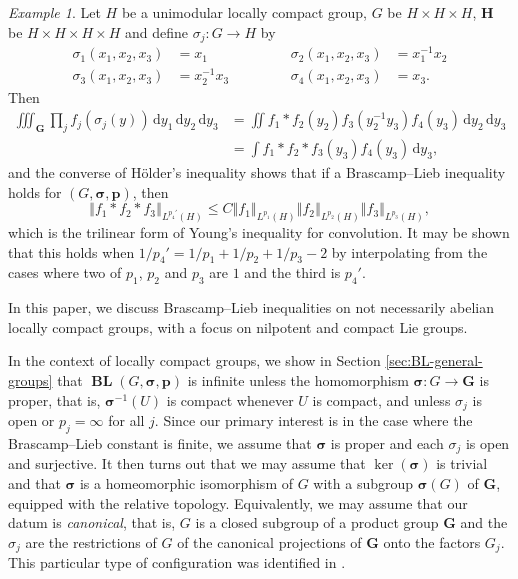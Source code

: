 \documentclass[12pt,twoside,a4paper]{amsart}
\theoremstyle{definition}
\theoremstyle{remark}
\newtheorem{example}[thm]{Example}%
\numberwithin{equation}{section}
\newcommand{\wrt}[1]{\,\mathrm{d} #1}
\newcommand{\BL}{\operatorname{\mathbf{BL}}}
\newcommand{\bss}{\boldsymbol{\sigma}}
\newcommand{\bsp}{\boldsymbol{p}}
\newcommand{\bsG}{\boldsymbol{G}}
\newcommand{\bsH}{\boldsymbol{H}}
\newcommand{\norm}[1]{\left\Vert #1 \right\Vert}
\begin{document}
\begin{example}\label{ex:Young}
Let $H$ be a unimodular locally compact group,  $G$ be $H \times H \times H$, $\bsH$ be $H \times H \times H \times H$ and define $\sigma_j \colon  G \to H$ by 
\[
\begin{aligned}
\sigma_1(x_1, x_2,x_3) &= x_1 &&\qquad& \sigma_2(x_1, x_2,x_3) &= x_1^{-1}x_2  \\
\sigma_3(x_1, x_2,x_3) &= x_2^{-1}x_3 &&&  \sigma_4(x_1, x_2,x_3) &= x_3 .
\end{aligned}
\]
Then
\[
\begin{aligned}
\iiint_{\bsG} \prod_j f_j (\sigma_j (y)) \wrt y_1\wrt y_2\wrt y_3 
&= \iint  f_1 * f_2(y_2) f_3(y_2^{-1} y_3) f_4(y_3) \wrt y_2\wrt y_3  \\
&= \int f_1 * f_2 * f_3 (y_3) f_4(y_3) \wrt y_3,
\end{aligned}
\]
and the converse of Hölder's inequality shows that if a Brascamp--Lieb inequality holds for $(G, \bss, \bsp)$, then
\[
\norm{ f_1 * f_2 * f_3 }_{L^{p_4'}(H)} 
\leq C \norm{ f_1 }_{L^{p_1}(H)} \norm{ f_2  }_{L^{p_2}(H)} \norm{ f_3 }_{L^{p_3}(H)}  ,
\]
which is the trilinear form of Young's inequality for convolution.
It may be shown that this holds when $1/p_4' = 1/p_{1} + 1/p_{2} + 1/p_{3} -2$ by interpolating from the cases where two of $p_1$, $p_2$  and $p_3$  are $1$ and the third is $p_4'$.
\end{example}


In this paper, we discuss Brascamp--Lieb inequalities on not necessarily abelian locally compact groups, with a focus on nilpotent and compact Lie groups. 

In the context of locally compact groups, we show in Section \ref{sec:BL-general-groups} that $\BL(G, \bss, \bsp)$ is infinite unless the homomorphism $\bss\colon  G \to \bsG$ is proper, that is, $\bss^{-1}(U)$ is compact whenever $U$ is compact, and unless $\sigma_j$ is open or $p_j = \infty$ for all $j$.
Since our primary interest is in the case where the Brascamp--Lieb constant is finite, we assume that $\bss$ is proper and each $\sigma_j$ is open and surjective.
It then turns out that we may assume that $\ker(\bss)$ is trivial and that $\bss$ is a homeomorphic isomorphism of $G$ with a subgroup $\bss(G)$ of $\bsG$, equipped with the relative topology.
Equivalently, we may assume that our datum is \emph{canonical}, that is, $G$ is a closed subgroup of a product group $\bsG$ and the $\sigma_j$ are the restrictions of $G$ of the canonical projections of $\bsG$ onto the factors $G_j$.
This particular type of configuration was identified in \cite{BBBCF20}.
\end{document}
